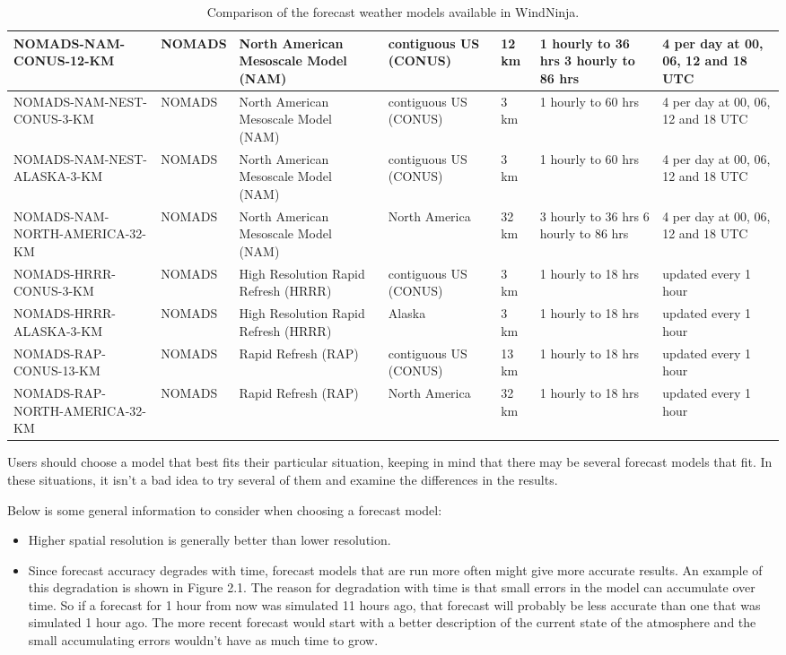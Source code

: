 \documentclass[12pt]{article}
\begin{document}
\begin{landscape}
\begin{table}
\begin{tabular}{|p{6cm}|p{1.3cm}|p{3.5cm}|p{2cm}|p{1.7cm}|p{2.8cm}|p{2.8cm}|}
\hline
NOMADS-NAM-CONUS-12-KM & NOMADS & North American Mesoscale Model (NAM) & contiguous US (CONUS) & 12 km & 1 hourly to 36 hrs 3 hourly to 86 hrs & 4 per day at 00, 06, 12 and 18 UTC\\
\hline
NOMADS-NAM-NEST-CONUS-3-KM & NOMADS & North American Mesoscale Model (NAM) & contiguous US (CONUS) & 3 km & 1 hourly to 60 hrs & 4 per day at 00, 06, 12 and 18 UTC\\
\hline
NOMADS-NAM-NEST-ALASKA-3-KM & NOMADS & North American Mesoscale Model (NAM) & contiguous US (CONUS) & 3 km & 1 hourly to 60 hrs & 4 per day at 00, 06, 12 and 18 UTC\\
\hline
NOMADS-NAM-NORTH-AMERICA-32-KM & NOMADS & North American Mesoscale Model (NAM) & North America & 32 km & 3 hourly to 36 hrs 6 hourly to 86 hrs & 4 per day at 00, 06, 12 and 18 UTC\\
\hline
NOMADS-HRRR-CONUS-3-KM & NOMADS & High Resolution Rapid Refresh (HRRR) & contiguous US (CONUS) & 3 km & 1 hourly to 18 hrs & updated every 1 hour\\
\hline
NOMADS-HRRR-ALASKA-3-KM & NOMADS & High Resolution Rapid Refresh (HRRR) & Alaska & 3 km & 1 hourly to 18 hrs & updated every 1 hour\\
\hline
NOMADS-RAP-CONUS-13-KM & NOMADS & Rapid Refresh (RAP) & contiguous US (CONUS) & 13 km & 1 hourly to 18 hrs & updated every 1 hour\\
\hline
NOMADS-RAP-NORTH-AMERICA-32-KM & NOMADS & Rapid Refresh (RAP) & North America & 32 km & 1 hourly to 18 hrs & updated every 1 hour\\
\hline
\end{tabular}
\caption{Comparison of the forecast weather models available in WindNinja.}
\end{table}
\end{landscape}

Users should choose a model that best fits their particular situation, keeping in mind that there may be several forecast models that fit.  In these situations, it isn't a bad idea to try several of them and examine the differences in the results.


Below is some general information to consider when choosing a forecast model:
\begin{itemize}
\item Higher spatial resolution is generally better than lower resolution.
\item Since forecast accuracy degrades with time, forecast models that are run more often might give more accurate results.  An example of this degradation is shown in Figure 2.1.  The reason for degradation with time is that small errors in the model can accumulate over time.  So if a forecast for 1 hour from now was simulated 11 hours ago, that forecast will probably be less accurate than one that was simulated 1 hour ago.  The more recent forecast would start with a better description of the current state of the atmosphere and the small accumulating errors wouldn't have as much time to grow.
\end{itemize}
\end{document}
